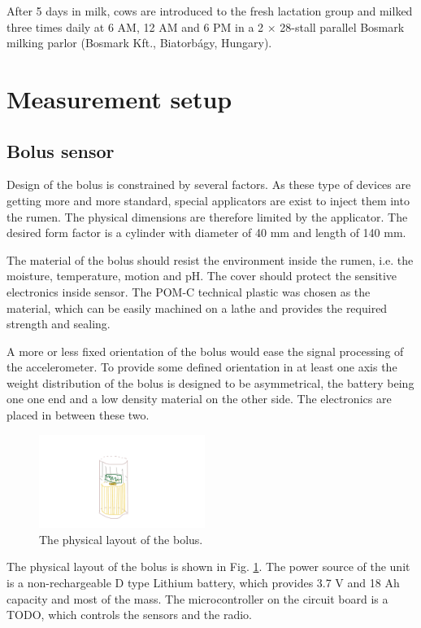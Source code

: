 \documentclass[conference]{IEEEtran}
\begin{document}
After 5 days in milk, cows are introduced to the fresh lactation group and milked three times daily at 6 AM, 12 AM and 6 PM in a 2 × 28-stall parallel Bosmark milking parlor (Bosmark Kft., Biatorbágy, Hungary).

\section{Measurement setup}

\subsection{Bolus sensor}

Design of the bolus is constrained by several factors. As these type
of devices are getting more and more standard, special applicators are
exist to inject them into the rumen. The physical dimensions are therefore
limited by the applicator. The desired form factor is a cylinder with
diameter of 40 mm and length of 140 mm.

The material of the bolus should resist the environment inside the rumen,
i.e. the moisture, temperature, motion and pH. The cover should protect
the sensitive electronics inside sensor. The POM-C technical plastic was
chosen as the material, which can be easily machined on a lathe and provides
the required strength and sealing.

A more or less fixed orientation of the bolus would ease the signal
processing of the accelerometer. To provide some defined orientation
in at least one axis the weight distribution of the bolus is designed
to be asymmetrical, the battery being one one end and a low density
material on the other side. The electronics are placed in between these two.

\begin{figure}[htbp]
\centerline{\includegraphics[width=0.48\textwidth]{fig/bolus-physical-layout.png}}
\caption{The physical layout of the bolus.}
\label{bolus-physical-layout}
\end{figure}

The physical layout of the bolus is shown in Fig. \ref{bolus-physical-layout}.
The power source of the unit is a non-rechargeable D type Lithium battery,
which provides 3.7 V and 18 Ah capacity and most of the mass. The
microcontroller on the circuit board is a TODO, which controls the
sensors and the radio.
\end{document}
